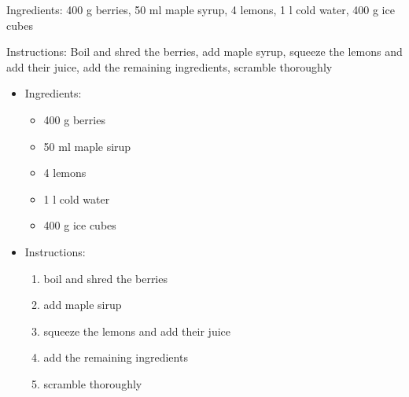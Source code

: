 Ingredients:
400 g berries, 50 ml maple syrup, 4 lemons, 1 l cold water, 400 g ice cubes

\noindent Instructions: Boil and shred the berries, add maple syrup, squeeze the lemons and add their juice, add the remaining ingredients, scramble thoroughly

\begin{itemize}
	\item Ingredients:
	\begin{itemize}
		\item 400 g berries
		\item 50 ml maple sirup 
		\item 4 lemons
		\item 1 l cold water
		\item 400 g ice cubes
	\end{itemize}

	\item Instructions:
	\begin{enumerate}
		\item boil and shred the berries
		\item add maple sirup
		\item squeeze the lemons and add their juice
		\item add the remaining ingredients
		\item scramble thoroughly
	\end{enumerate}
\end{itemize}